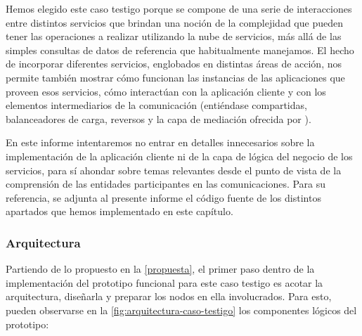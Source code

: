 Hemos elegido este caso testigo porque se compone de una serie de interacciones entre distintos servicios que brindan una noción de la complejidad que pueden tener las operaciones a realizar utilizando la nube de servicios, más allá de las simples consultas de datos de referencia que habitualmente manejamos. El hecho de incorporar diferentes servicios, englobados en distintas áreas de acción, nos permite también mostrar cómo funcionan las instancias de las aplicaciones que proveen esos servicios, cómo interactúan con la aplicación cliente y con los elementos intermediarios de la comunicación (entiéndase  compartidas, balanceadores de carga,  reversos y la capa de mediación ofrecida por ).

En este informe intentaremos no entrar en detalles innecesarios sobre la implementación de la aplicación cliente ni de la capa de lógica del negocio de los servicios, para sí ahondar sobre temas relevantes desde el punto de vista de la comprensión de las entidades participantes en las comunicaciones. Para su referencia, se adjunta al presente informe el código fuente de los distintos apartados que hemos implementado en este capítulo.


\subsubsection{Arquitectura}

Partiendo de lo propuesto en la \autoref{propuesta}, el primer paso dentro de la implementación del prototipo funcional para este caso testigo es acotar la arquitectura, diseñarla y preparar los nodos en ella involucrados. Para esto, pueden observarse en la \autoref{fig:arquitectura-caso-testigo} los componentes lógicos del prototipo:

